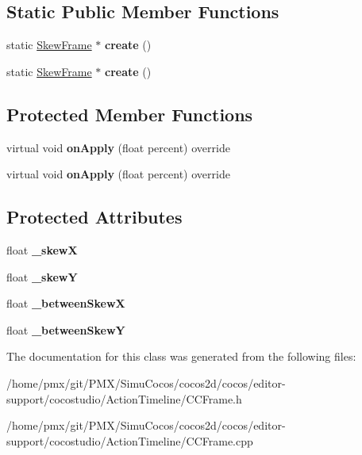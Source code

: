 \subsection*{Static Public Member Functions}
\begin{DoxyCompactItemize}
\item 
\mbox{\label{classSkewFrame_a35c21b2576826f72df8ba715d76c527b}} 
static \hyperlink{classSkewFrame}{Skew\+Frame} $\ast$ {\bfseries create} ()
\item 
\mbox{\label{classSkewFrame_a933faa399664a3cf485eff0315ddf608}} 
static \hyperlink{classSkewFrame}{Skew\+Frame} $\ast$ {\bfseries create} ()
\end{DoxyCompactItemize}
\subsection*{Protected Member Functions}
\begin{DoxyCompactItemize}
\item 
\mbox{\label{classSkewFrame_ae815292d9b17d2cd64d06801ff9176e3}} 
virtual void {\bfseries on\+Apply} (float percent) override
\item 
\mbox{\label{classSkewFrame_afc184e453951a736c3af1dfd421220dd}} 
virtual void {\bfseries on\+Apply} (float percent) override
\end{DoxyCompactItemize}
\subsection*{Protected Attributes}
\begin{DoxyCompactItemize}
\item 
\mbox{\label{classSkewFrame_a047c1bc65ff21a2e4071633390ef6182}} 
float {\bfseries \+\_\+skewX}
\item 
\mbox{\label{classSkewFrame_ad2220345cd2f23d3b685fe4c9fc02faa}} 
float {\bfseries \+\_\+skewY}
\item 
\mbox{\label{classSkewFrame_a116d8075a9e8d018be552c013a5ae9a5}} 
float {\bfseries \+\_\+between\+SkewX}
\item 
\mbox{\label{classSkewFrame_afe552cc770fa4b52eb19e393d36d6bc3}} 
float {\bfseries \+\_\+between\+SkewY}
\end{DoxyCompactItemize}


The documentation for this class was generated from the following files\+:\begin{DoxyCompactItemize}
\item 
/home/pmx/git/\+P\+M\+X/\+Simu\+Cocos/cocos2d/cocos/editor-\/support/cocostudio/\+Action\+Timeline/C\+C\+Frame.\+h\item 
/home/pmx/git/\+P\+M\+X/\+Simu\+Cocos/cocos2d/cocos/editor-\/support/cocostudio/\+Action\+Timeline/C\+C\+Frame.\+cpp\end{DoxyCompactItemize}
